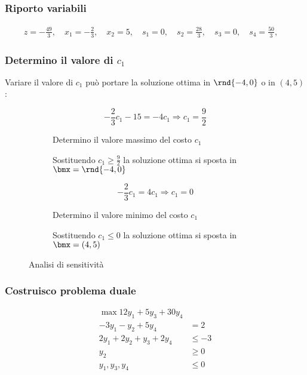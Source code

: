 \documentclass[\main/main.tex]{subfiles}
\begin{document}
\subsubsection*{Riporto variabili}

\begin{align*}
  z   = -\frac{49}{3}, \quad
  x_1 = -\frac{2}{3} , \quad
  x_2 = 5            , \quad
  s_1 = 0            , \quad
  s_2 = \frac{28}{3} , \quad
  s_3 = 0            , \quad
  s_4 = \frac{50}{3} , \quad
\end{align*}
\subsubsection*{Determino il valore di $c_1$}
Variare il valore di $c_1$ può portare la soluzione ottima in $\rnd{-4,0}$ o in $(4,5)$:

\begin{figure}
  \begin{subfigure}{0.49\textwidth}
    \[
      -\frac{2}{3}c_1 -15 = -4c_1 \Rightarrow c_1 = \frac{9}{2}
    \]
    \caption{Determino il valore massimo del costo $c_1$}
  \end{subfigure}
  \begin{subfigure}{0.49\textwidth}
    \caption{Sostituendo $c_1\geq\frac{9}{2}$ la soluzione ottima si sposta in $\bmx=\rnd{-4, 0}$}
  \end{subfigure}
  \begin{subfigure}{0.49\textwidth}
    \[
      -\frac{2}{3}c_1 = 4c_1 \Rightarrow c_1 = 0
    \]
    \caption{Determino il valore minimo del costo $c_1$}
  \end{subfigure}
  \begin{subfigure}{0.49\textwidth}
    \caption{Sostituendo $c_1\leq0$ la soluzione ottima si sposta in $\bmx=(4,5)$}
  \end{subfigure}
  \caption{Analisi di sensitività}
\end{figure}

\subsubsection*{Costruisco problema duale}
\begin{align*}
  \max 12y_1 +5y_3 + 30y_4           \\
  -3y_1 -y_2 +5y_4         & = 2     \\
  2y_1 + 2y_2 + y_3 + 2y_4 & \leq -3 \\
  y_2                      & \geq 0  \\
  y_1, y_3, y_4            & \leq 0
\end{align*}
\end{document}
